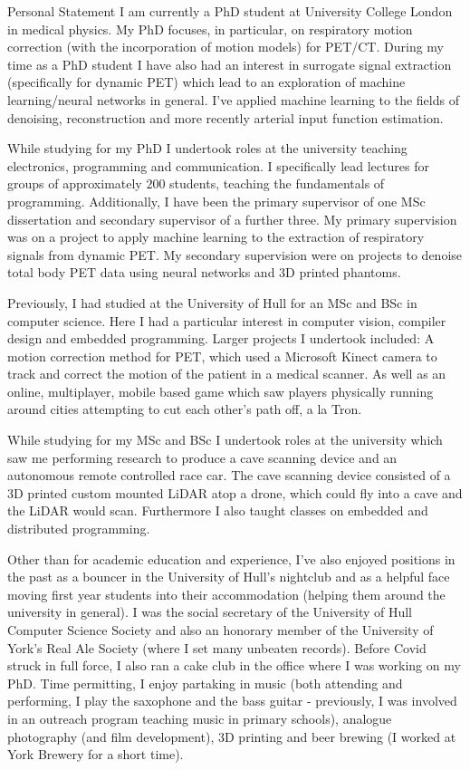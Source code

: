 \documentclass{cv}
\begin{document}
    \begin{rSection}{Personal Statement}
        I am currently a PhD student at University College London in medical physics. My PhD focuses, in particular, on respiratory motion correction (with the incorporation of motion models) for PET/CT. During my time as a PhD student I have also had an interest in surrogate signal extraction (specifically for dynamic PET) which lead to an exploration of machine learning/neural networks in general. I've applied machine learning to the fields of denoising, reconstruction and more recently arterial input function estimation.
        
        While studying for my PhD I undertook roles at the university teaching electronics, programming and communication. I specifically lead lectures for groups of approximately $200$ students, teaching the fundamentals of programming. Additionally, I have been the primary supervisor of one MSc dissertation and secondary supervisor of a further three. My primary supervision was on a project to apply machine learning to the extraction of respiratory signals from dynamic PET. My secondary supervision were on projects to denoise total body PET data using neural networks and 3D printed phantoms.
        
        Previously, I had studied at the University of Hull for an MSc and BSc in computer science. Here I had a particular interest in computer vision, compiler design and embedded programming. Larger projects I undertook included: A motion correction method for PET, which used a Microsoft Kinect camera to track and correct the motion of the patient in a medical scanner. As well as an online, multiplayer, mobile based game which saw players physically running around cities attempting to cut each other's path off, a la Tron.
        
        While studying for my MSc and BSc I undertook roles at the university which saw me performing research to produce a cave scanning device and an autonomous remote controlled race car. The cave scanning device consisted of a 3D printed custom mounted LiDAR atop a drone, which could fly into a cave and the LiDAR would scan. Furthermore I also taught classes on embedded and distributed programming.
        
        Other than for academic education and experience, I've also enjoyed positions in the past as a bouncer in the University of Hull's nightclub and as a helpful face moving first year students into their accommodation (helping them around the university in general). I was the social secretary of the University of Hull Computer Science Society and also an honorary member of the University of York's Real Ale Society (where I set many unbeaten records). Before Covid struck in full force, I also ran a cake club in the office where I was working on my PhD. Time permitting, I enjoy partaking in music (both attending and performing, I play the saxophone and the bass guitar - previously, I was involved in an outreach program teaching music in primary schools), analogue photography (and film development), 3D printing and beer brewing (I worked at York Brewery for a short time).
    \end{rSection}
    
\end{document}
